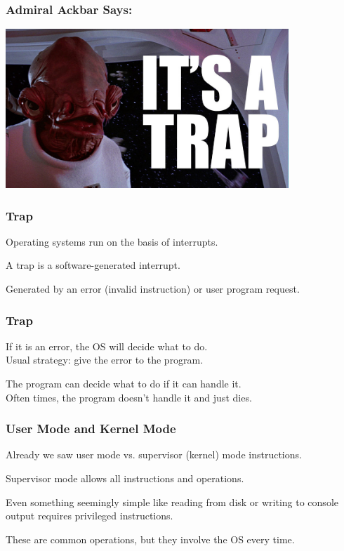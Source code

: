 \begin{frame}
\frametitle{Admiral Ackbar Says:}

\begin{center}
\includegraphics[width=0.8\textwidth]{images/itsatrap.jpg}
\end{center}

\end{frame}


\begin{frame}
\frametitle{Trap}

Operating systems run on the basis of interrupts.

A \alert{trap} is a software-generated interrupt.

Generated by an error (invalid instruction) or user program request.

\end{frame}

\begin{frame}
\frametitle{Trap}

If it is an error, the OS will decide what to do.\\
\quad Usual strategy: give the error to the program.

The program can decide what to do if it can handle it.\\
\quad Often times, the program doesn't handle it and just dies.

\end{frame}

\begin{frame}
\frametitle{User Mode and Kernel Mode}

Already we saw user mode vs. supervisor (kernel) mode instructions.

Supervisor mode allows all instructions and operations.

Even something seemingly simple like reading from disk or writing to console output requires privileged instructions. 

These are common operations, but they involve the OS every time.


\end{frame}

